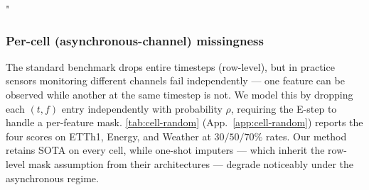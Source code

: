 "\documentclass{article}
\theoremstyle{plain}
\theoremstyle{definition}
\theoremstyle{remark}
\begin{document}
\begin{table}[!t]
    \centering
    \caption{Averaged results over $30\%$, $50\%$, $70\%$ missing rates under three blocking patterns at length $24$. Best Disc.\ in bold; `-' marks runs still pending.}
    \label{tab:results_blocking}
\end{table}

\subsubsection{Per-cell (asynchronous-channel) missingness}
\label{sec:quant-cell}

The standard benchmark drops entire timesteps (row-level), but in practice sensors monitoring different channels fail independently --- one feature can be observed while another at the same timestep is not. We model this by dropping each $(t, f)$ entry independently with probability $\rho$, requiring the E-step to handle a per-feature mask. \cref{tab:cell-random} (App.~\ref{app:cell-random}) reports the four scores on ETTh1, Energy, and Weather at $30/50/70\%$ rates. Our method retains SOTA on every cell, while one-shot imputers --- which inherit the row-level mask assumption from their architectures --- degrade noticeably under the asynchronous regime.
\end{document}
